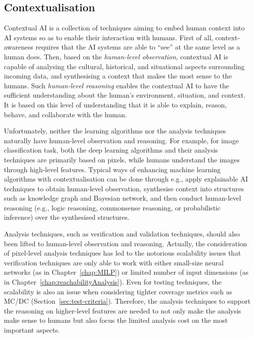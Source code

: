 \subsection*{Contextualisation}\label{sec:contextualAI}




Contextual AI is a collection of techniques aiming to embed human context into AI systems so as to enable their interaction with humans. First of all, context-awareness requires that the AI systems are able to ``see'' at the same level as a human does. Then, based on the \emph{human-level observation}, contextual AI is capable of analysing the cultural, historical, and situational aspects surrounding incoming data, and synthesising a context that makes the most sense to the humans. Such \emph{human-level reasoning} enables the contextual AI to have the sufficient understanding about the human’s environment, situation, and context. 
It is based on this level of understanding that it is able to explain, reason, behave, and collaborate with the human. 
%


Unfortunately, neither the learning algorithms nor the analysis techniques naturally have human-level observation and reasoning. For example, for image classification task, both the deep learning algorithms and their analysis techniques are primarily based on pixels, while humans understand the images through high-level features. Typical ways of enhancing machine learning algorithms with contextualisation can be done through e.g., apply explainable AI techniques to obtain human-level observation, synthesise context into structures such as knowledge graph and Bayesian network, and then 
conduct human-level reasoning (e.g., logic reasoning, commonsense reasoning, or probabilistic inference) over the synthesised structures. 


Analysis techniques, such as verification and validation techniques, should also been lifted to human-level observation and reasoning. Actually, the consideration of pixel-level analysis techniques has led to the notorious scalability issues that verification techniques are only able to work with either small-size neural networks (as in Chapter~\ref{chap:MILP}) or limited number of input dimensions (as in Chapter~\ref{chap:reachabilityAnalysis}). Even for testing techniques, the scalability is also an issue when considering tighter coverage metrics such as MC/DC (Section~\ref{sec:test-criteria}). Therefore, the analysis techniques to support the reasoning on higher-level features are needed to not only make the analysis make sense to humans but also focus the limited analysis cost on the most important aspects. 

